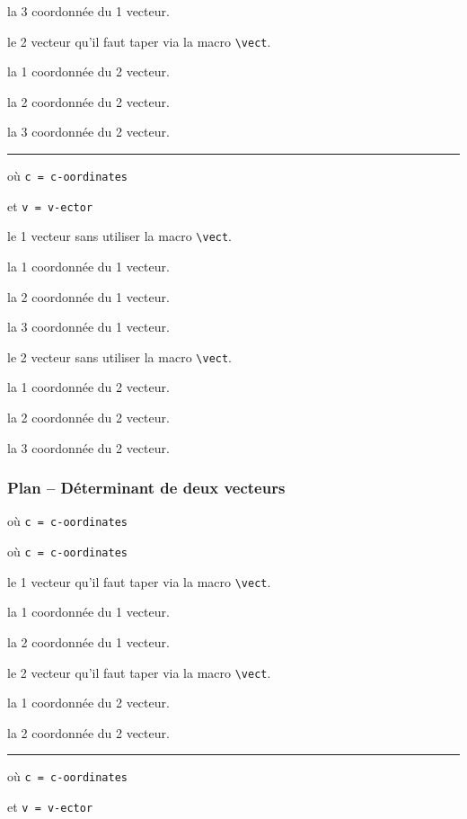 \documentclass[12pt,a4paper]{article}
\newcommand\env[1]{\texttt{#1}}
\newcommand\macro[1]{\env{\textbackslash{}#1}}
\theoremstyle{definition}
\newcommand\separation{
	\medskip
	\hfill\rule{0.5\textwidth}{0.75pt}\hfill
	\medskip
}
\newcommand\mwhyprefix[2]{%
	\texttt{#1 = #1-#2}%
}
\begin{document}
 la 3\ieme{} coordonnée du 1\ier{} vecteur.

 le 2\ieme{} vecteur qu'il faut taper via la macro \macro{vect}.

 la 1\iere{} coordonnée du 2\ieme{} vecteur.

 la 2\ieme{} coordonnée du 2\ieme{} vecteur.

 la 3\ieme{} coordonnée du 2\ieme{} vecteur.


\separation


 où \quad \mwhyprefix{c}{oordinates}
                                et \mwhyprefix{v}{ector}

 le 1\ier{} vecteur sans utiliser la macro \macro{vect}.

 la 1\iere{} coordonnée du 1\ier{} vecteur.

 la 2\ieme{} coordonnée du 1\ier{} vecteur.

 la 3\ieme{} coordonnée du 1\ier{} vecteur.

 le 2\ieme{} vecteur sans utiliser la macro \macro{vect}.

 la 1\iere{} coordonnée du 2\ieme{} vecteur.

 la 2\ieme{} coordonnée du 2\ieme{} vecteur.

 la 3\ieme{} coordonnée du 2\ieme{} vecteur.
\subsubsection{Plan -- Déterminant de deux vecteurs}

  où \quad \mwhyprefix{c}{oordinates}

 où \quad \mwhyprefix{c}{oordinates}


 le 1\ier{} vecteur qu'il faut taper via la macro \macro{vect}.

 la 1\iere{} coordonnée du 1\ier{} vecteur.

 la 2\ieme{} coordonnée du 1\ier{} vecteur.

 le 2\ieme{} vecteur qu'il faut taper via la macro \macro{vect}.

 la 1\iere{} coordonnée du 2\ieme{} vecteur.

 la 2\ieme{} coordonnée du 2\ieme{} vecteur.


\separation


  où \quad \mwhyprefix{c}{oordinates}
                                et \mwhyprefix{v}{ector}
\end{document}
